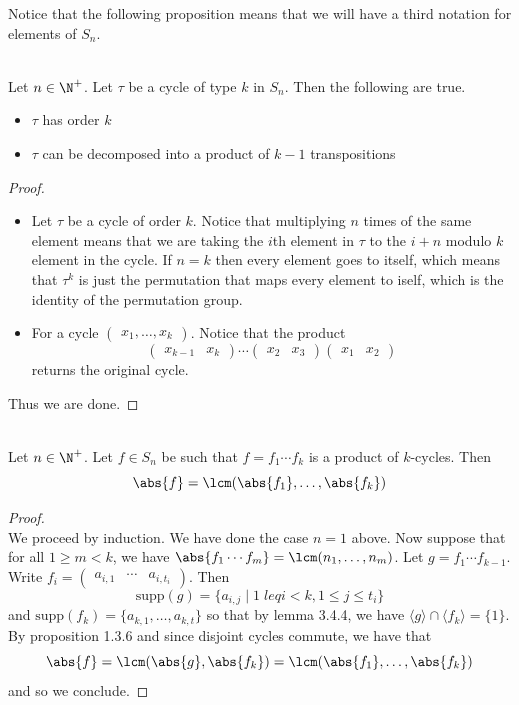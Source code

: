 \documentclass[a4paper]{article}
\begin{document}
Notice that the following proposition means that we will have a third notation for elements of $S_n$. 

\begin{prp}{}{}\\
Let $n\in\N^+$. Let $\tau$ be a cycle of type $k$ in $S_n$. Then the following are true. 
\begin{itemize}
\item $\tau$ has order $k$
\item $\tau$ can be decomposed into a product of $k-1$ transpositions
\end{itemize}
\begin{proof}\\
\begin{itemize}
\item Let $\tau$ be a cycle of order $k$. Notice that multiplying $n$ times of the same element means that we are taking the $i$th element in $\tau$ to the $i+n$ modulo $k$ element in the cycle. If $n=k$ then every element goes to itself, which means that $\tau^k$ is just the permutation that maps every element to iself, which is the identity of the permutation group. 
\item For a cycle $\begin{pmatrix}x_1,\dots,x_k\end{pmatrix}$. Notice that the product $$\begin{pmatrix}x_{k-1}&x_k\end{pmatrix}\cdots\begin{pmatrix}x_2&x_3\end{pmatrix}\begin{pmatrix}x_1&x_2\end{pmatrix}$$ returns the original cycle. 
\end{itemize}
Thus we are done. 
\end{proof}
\end{prp}

\begin{prp}{}{}\\
Let $n\in\N^+$. Let $f\in S_n$ be such that $f=f_1\cdots f_k$ is a product of $k$-cycles. Then $$\abs{f}=\lcm(\abs{f_1},\dots,\abs{f_k})$$ 
\begin{proof}\\
We proceed by induction. We have done the case $n=1$ above. Now suppose that for all $1\geq m<k$, we have $\abs{f_1\cdots f_m}=\lcm(n_1,\dots,n_m)$. Let $g=f_1\cdots f_{k-1}$. Write $f_i=\begin{pmatrix}a_{i,1}&\cdots&a_{i,t_i}\end{pmatrix}$. Then $$\text{supp}(g)=\{a_{i,j}\;|\;1\;leq i<k, 1\leq j\leq t_i\}$$ and $\text{supp}(f_k)=\{a_{k,1},\dots,a_{k,t}\}$ so that by lemma 3.4.4, we have $\langle g\rangle\cap\langle f_k\rangle=\{1\}$. By proposition 1.3.6 and since disjoint cycles commute, we have that $$\abs{f}=\lcm(\abs{g},\abs{f_k})=\lcm(\abs{f_1},\dots,\abs{f_k})$$ and so we conclude. 
\end{proof}
\end{prp}
\end{document}
